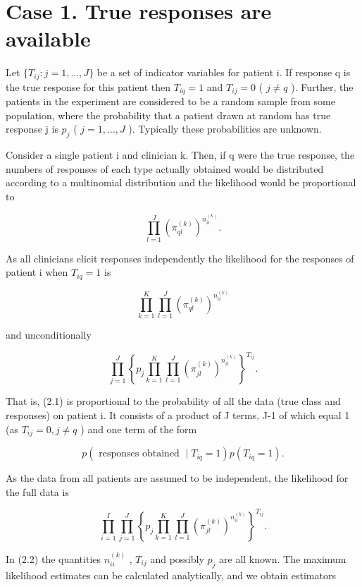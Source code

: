 \documentclass[
]{article}
\begin{document}
\section{Case 1. True responses are
available}\label{case-1.-true-responses-are-available}

Let \(\{T_{ij}: j=1,\ldots,J\}\) be a set of indicator variables for
patient i. If response q is the true response for this patient then
\(T_{iq}=1\) and \(T_{ij}=0\) ( \(j\neq q\) ). Further, the patients in
the experiment are considered to be a random sample from some
population, where the probability that a patient drawn at random has
true response j is \(p_{j}\) ( \(j=1,\ldots,J\) ). Typically these
probabilities are unknown.

Consider a single patient i and clinician k. Then, if q were the true
response, the numbers of responses of each type actually obtained would
be distributed according to a multinomial distribution and the
likelihood would be proportional to

\[
\prod_ {l = 1} ^ {J} \left(\pi_ {q l} ^ {(k)}\right) ^ {n _ {i l} ^ {(k)}}.
\]

As all clinicians elicit responses independently the likelihood for the
responses of patient i when \(T_{iq} = 1\) is

\[
\prod_ {k = 1} ^ {K} \prod_ {l = 1} ^ {J} \left(\pi_ {q l} ^ {(k)}\right) ^ {n _ {i l} ^ {(k)}}
\]

and unconditionally

\[
\prod_ {j = 1} ^ {J} \left\{p _ {j} \prod_ {k = 1} ^ {K} \prod_ {l = 1} ^ {J} \left(\pi_ {j l} ^ {(k)}\right) ^ {n _ {i l} ^ {(k)}} \right\} ^ {T _ {i j}}. \tag {2.1}
\]

That is, (2.1) is proportional to the probability of all the data (true
class and responses) on patient i. It consists of a product of J terms,
J-1 of which equal 1 (as \(T_{ij}=0, j\neq q\) ) and one term of the
form

\[
p (\text { responses   obtained } \mid T _ {i q} = 1) p (T _ {i q} = 1).
\]

As the data from all patients are assumed to be independent, the
likelihood for the full data is

\[
\prod_ {i = 1} ^ {I} \prod_ {j = 1} ^ {J} \left\{p _ {j} \prod_ {k = 1} ^ {K} \prod_ {l = 1} ^ {J} \left(\pi_ {j l} ^ {(k)}\right) ^ {n _ {i l} ^ {(k)}} \right\} ^ {T _ {i j}}. \tag {2.2}
\]

In (2.2) the quantities \(n_{ii}^{(k)}\) , \(T_{ij}\) and possibly
\(p_{j}\) are all known. The maximum likelihood estimates can be
calculated analytically, and we obtain estimators
\end{document}

